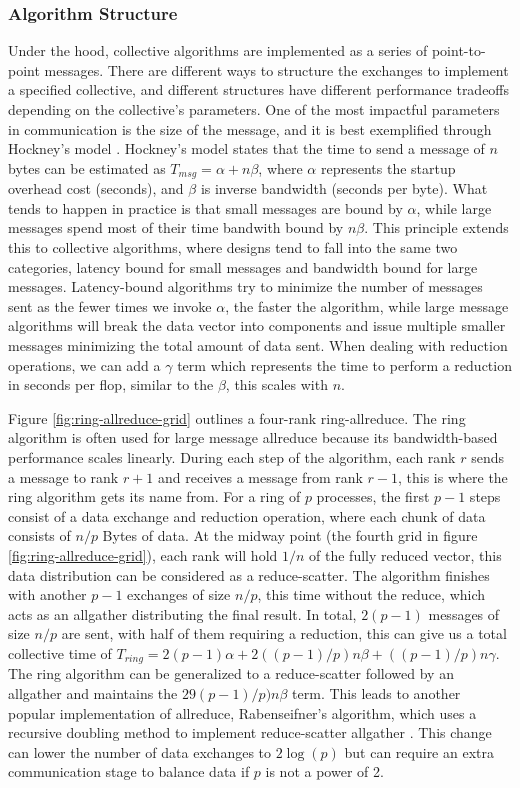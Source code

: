 \subsubsection{Algorithm Structure}
Under the hood, collective algorithms are implemented as a series of point-to-point messages. 
There are different ways to structure the exchanges to implement a specified collective, and different structures have different performance tradeoffs depending on the collective's parameters.
One of the most impactful parameters in communication is the size of the message, and it is best exemplified through Hockney's model \cite{Hockney1994HockenyModel}.
Hockney's model states that the time to send a message of $n$ bytes can be estimated as $T_{msg}=\alpha+n\beta$, where $\alpha$ represents the startup overhead cost (seconds), and $\beta$ is inverse bandwidth (seconds per byte).
What tends to happen in practice is that small messages are bound by $\alpha$, while large messages spend most of their time bandwith bound by $n\beta$.
This principle extends this to collective algorithms, where designs tend to fall into the same two categories, latency bound for small messages and bandwidth bound for large messages.
Latency-bound algorithms try to minimize the number of messages sent as the fewer times we invoke $\alpha$, the faster the algorithm, while large message algorithms will break the data vector into components and issue multiple smaller messages minimizing the total amount of data sent.
When dealing with reduction operations, we can add a $\gamma$ term which represents the time to perform a reduction in seconds per flop, similar to the $\beta$, this scales with $n$.


Figure \ref{fig:ring-allreduce-grid} outlines a four-rank ring-allreduce.
The ring algorithm is often used for large message allreduce because its bandwidth-based performance scales linearly.
During each step of the algorithm, each rank $r$ sends a message to rank $r+1$ and receives a message from rank $r-1$, this is where the ring algorithm gets its name from.
For a ring of $p$ processes, the first $p-1$ steps consist of a data exchange and reduction operation, where each chunk of data consists of $n/p$ Bytes of data. 
At the midway point (the fourth grid in figure \ref{fig:ring-allreduce-grid}), each rank will hold $1/n$ of the fully reduced vector, this data distribution can be considered as a reduce-scatter.
The algorithm finishes with another $p-1$ exchanges of size $n/p$, this time without the reduce, which acts as an allgather distributing the final result.
In total, $2(p-1)$ messages of size $n/p$ are sent, with half of them requiring a reduction, this can give us a total collective time of $T_{ring} = 2(p-1)\alpha + 2((p-1)/p)n\beta + ((p-1)/p)n\gamma$.
The ring algorithm can be generalized to a reduce-scatter followed by an allgather and maintains the $29(p-1)/p)n\beta$ term.
This leads to another popular implementation of allreduce, Rabenseifner's algorithm, which uses a recursive doubling method to implement reduce-scatter allgather \cite{Thakur2005OptMPICH}.
This change can lower the number of data exchanges to $2\log(p)$ but can require an extra communication stage to balance data if $p$ is not a power of 2.

